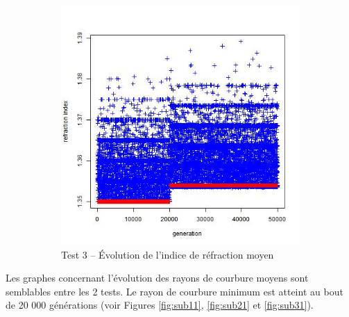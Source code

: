 \documentclass[a4paper,11pt]{article}
\begin{document}
\begin{figure}
\begin{subfigure}{.5\textwidth}
\includegraphics[width=1\linewidth]{1487424573992_evolution_average_refraction_index.jpeg}
\caption{Test 3 – Évolution de l'indice de réfraction moyen}
\label{fig:sub34}
\end{subfigure}
\caption{}
\label{fig:test}
\end{figure}

%

Les graphes concernant l'évolution des rayons de courbure moyens sont semblables entre les 2 tests. Le rayon de courbure minimum est atteint au bout de 20 000 générations (voir Figures \ref{fig:sub11}, \ref{fig:sub21} et \ref{fig:sub31}).\\
\end{document}
